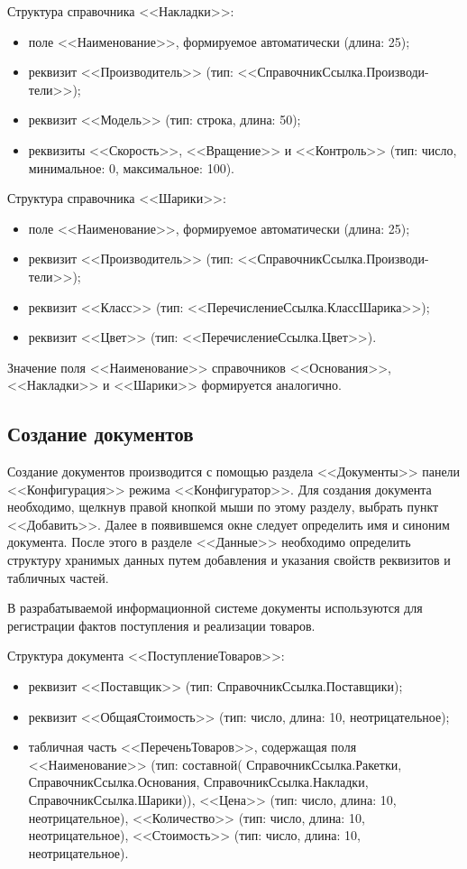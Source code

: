 Структура справочника <<Накладки>>:
\begin{itemize}
\item поле <<Наименование>>, формируемое автоматически (длина: 25);
\item реквизит <<Производитель>> (тип: <<СправочникСсылка.Производи-тели>>);
\item реквизит <<Модель>> (тип: строка, длина: 50);
\item реквизиты <<Скорость>>, <<Вращение>> и <<Контроль>>
  (тип: число, минимальное: 0, максимальное: 100).
\end{itemize}

Структура справочника <<Шарики>>:
\begin{itemize}
\item поле <<Наименование>>, формируемое автоматически (длина: 25);
\item реквизит <<Производитель>> (тип: <<СправочникСсылка.Производи-тели>>);
\item реквизит <<Класс>> (тип: <<ПеречислениеСсылка.КлассШарика>>);
\item реквизит <<Цвет>> (тип: <<ПеречислениеСсылка.Цвет>>).
\end{itemize}

Значение поля <<Наименование>> справочников <<Основания>>, <<Накладки>> и <<Шарики>>
формируется аналогично.

\subsection{Создание документов}

Создание документов производится с помощью раздела <<Документы>>
панели <<Конфигурация>> режима <<Конфигуратор>>.
Для создания документа необходимо, щелкнув правой кнопкой мыши по этому
разделу, выбрать пункт <<Добавить>>. Далее в появившемся окне
следует определить имя и синоним документа.
После этого в разделе <<Данные>> необходимо определить структуру
хранимых данных путем добавления и указания свойств реквизитов
и табличных частей.

В разрабатываемой информационной системе документы используются для
регистрации фактов поступления и реализации товаров.

Структура документа <<ПоступлениеТоваров>>:
\begin{itemize}
\item реквизит <<Поставщик>> (тип: СправочникСсылка.Поставщики);
\item реквизит <<ОбщаяСтоимость>> (тип: число, длина: 10, неотрицательное);
\item табличная часть <<ПереченьТоваров>>, содержащая поля
  <<Наименование>> (тип: составной(%
  СправочникСсылка.Ракетки,
  СправочникСсылка.Основания,
  СправочникСсылка.Накладки,
  СправочникСсылка.Шарики)),
  <<Цена>> (тип: число, длина: 10, неотрицательное),
  <<Количество>> (тип: число, длина: 10, неотрицательное),
  <<Стоимость>> (тип: число, длина: 10, неотрицательное).
\end{itemize}

